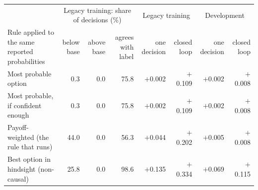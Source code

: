 \begin{tabular}{lrrrrrrr}
\toprule
 & \multicolumn{3}{c}{Legacy training: share of decisions (\%)} & \multicolumn{2}{c}{Legacy training} & \multicolumn{2}{c}{Development} \\
Rule applied to the same reported probabilities & below base & above base & agrees with label & one decision & closed loop & one decision & closed loop \\
\midrule
Most probable option & 0.3 & 0.0 & 75.8 & $+$0.002 & $+$0.109 & $+$0.002 & $+$0.008 \\
Most probable, if confident enough & 0.3 & 0.0 & 75.8 & $+$0.002 & $+$0.109 & $+$0.002 & $+$0.008 \\
Payoff-weighted (the rule that runs) & 44.0 & 0.0 & 56.3 & $+$0.044 & $+$0.202 & $+$0.005 & $+$0.008 \\
Best option in hindsight (non-causal) & 25.8 & 0.0 & 98.6 & $+$0.135 & $+$0.334 & $+$0.069 & $+$0.115 \\
\bottomrule
\end{tabular}
